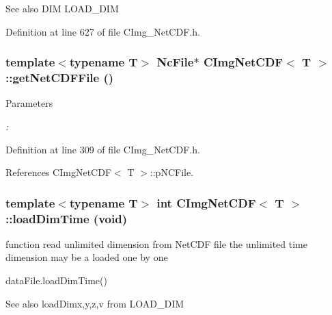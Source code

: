 \begin{DoxySeeAlso}{See also}
DIM LOAD\_\-DIM 
\end{DoxySeeAlso}


Definition at line 627 of file CImg\_\-NetCDF.h.\hypertarget{classCImgNetCDF_a658c9f9281a4a20cab568cf522ed197c}{
\subsubsection[{getNetCDFFile}]{\setlength{\rightskip}{0pt plus 5cm}template$<$typename T$>$ NcFile$\ast$ {\bf CImgNetCDF}$<$ T $>$::getNetCDFFile ()}}
\label{classCImgNetCDF_a658c9f9281a4a20cab568cf522ed197c}

\begin{DoxyParams}{Parameters}
\item[{\em :}]\end{DoxyParams}

\begin{DoxyCode}
\end{DoxyCode}
 

Definition at line 309 of file CImg\_\-NetCDF.h.

References CImgNetCDF$<$ T $>$::pNCFile.\hypertarget{classCImgNetCDF_a2ad26dcd306b26255c307e4f6d881240}{
\subsubsection[{loadDimTime}]{\setlength{\rightskip}{0pt plus 5cm}template$<$typename T$>$ int {\bf CImgNetCDF}$<$ T $>$::loadDimTime (void)}}
\label{classCImgNetCDF_a2ad26dcd306b26255c307e4f6d881240}


function read unlimited dimension from NetCDF file the unlimited time dimension may be a loaded one by one


\begin{DoxyCode}
   dataFile.loadDimTime()
\end{DoxyCode}


\begin{DoxySeeAlso}{See also}
loadDimx,y,z,v from LOAD\_\-DIM 
\end{DoxySeeAlso}


